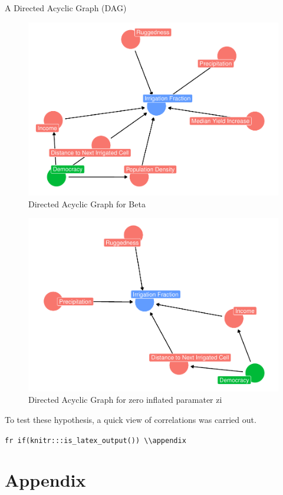\documentclass[12pt,twoside]{reedthesis}
\begin{document}
A Directed Acyclic Graph (DAG)
\begin{figure}
\centering
\includegraphics{thesis_files/figure-latex/mudag-1.pdf}
\caption{\label{fig:mudag}Directed Acyclic Graph for Beta}
\end{figure}
\begin{figure}
\centering
\includegraphics{thesis_files/figure-latex/zidag-1.pdf}
\caption{\label{fig:zidag}Directed Acyclic Graph for zero inflated paramater zi}
\end{figure}
To test these hypothesis, a quick view of correlations was carried out.

\texttt{fr\ if(knitr:::is\_latex\_output())\ \textquotesingle{}\textbackslash{}\textbackslash{}appendix\textquotesingle{}}

\hypertarget{appendix}{%
\chapter{Appendix}\label{appendix}}
\end{document}
